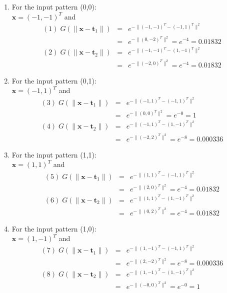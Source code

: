\begin{enumerate}
\begin{solution}
    \begin{enumerate}
    \item For the input pattern (0,0):\\
      $\mathbf{x}=(-1,-1)^T$ and
      \begin{eqnarray*}
        (1)\;G(\|\mathbf{x}-\mathbf{t}_1\|)&=&e^{-\|(-1,-1)^T-(-1,1)^T\|^2}\\
        &=&e^{-\|(0,-2)^T\|^2}=e^{-4}=0.01832\\
        (2)\;G(\|\mathbf{x}-\mathbf{t}_2\|)&=&e^{-\|(-1,-1)^T-(1,-1)^T\|^2}\\
        &=&e^{-\|(-2,0)^T\|^2}=e^{-4}=0.01832
      \end{eqnarray*}

    \item For the input pattern (0,1):\\
      $\mathbf{x}=(-1,1)^T$ and
      \begin{eqnarray*}
        (3)\;G(\|\mathbf{x}-\mathbf{t}_1\|)&=&e^{-\|(-1,1)^T-(-1,1)^T\|^2}\\
        &=&e^{-\|(0,0)^T\|^2}=e^{-0}=1\\
        (4)\;G(\|\mathbf{x}-\mathbf{t}_2\|)&=&e^{-\|(-1,1)^T-(1,-1)^T\|^2}\\
        &=&e^{-\|(-2,2)^T\|^2}=e^{-8}=0.000336
      \end{eqnarray*}

    \item For the input pattern (1,1):\\
      $\mathbf{x}=(1,1)^T$ and
      \begin{eqnarray*}
        (5)\;G(\|\mathbf{x}-\mathbf{t}_1\|)&=&e^{-\|(1,1)^T-(-1,1)^T\|^2}\\
        &=&e^{-\|(2,0)^T\|^2}=e^{-4}=0.01832\\
        (6)\;G(\|\mathbf{x}-\mathbf{t}_2\|)&=&e^{-\|(1,1)^T-(1,-1)^T\|^2}\\
        &=&e^{-\|(0,2)^T\|^2}=e^{-4}=0.01832
      \end{eqnarray*}

    \item For the input pattern (1,0):\\
      $\mathbf{x}=(1,-1)^T$ and
      \begin{eqnarray*}
        (7)\;G(\|\mathbf{x}-\mathbf{t}_1\|)&=&e^{-\|(1,-1)^T-(-1,1)^T\|^2}\\
        &=&e^{-\|(2,-2)^T\|^2}=e^{-8}=0.000336\\
        (8)\;G(\|\mathbf{x}-\mathbf{t}_2\|)&=&e^{-\|(1,-1)^T-(1,-1)^T\|^2}\\
        &=&e^{-\|(-0,0)^T\|^2}=e^{-0}=1
      \end{eqnarray*}
    \end{enumerate}


\end{solution}
\end{enumerate}
